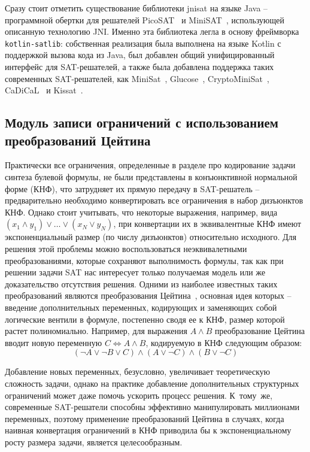 Сразу стоит отметить существование библиотеки jnisat на языке Java \--- программной обертки для решателей PicoSAT~\cite{biere2008} и MiniSAT~\cite{minisat}, использующей описанную технологию JNI.
Именно эта библиотека легла в основу фреймворка \texttt{kotlin-satlib}: собственная реализация была выполнена на языке Kotlin с поддержкой вызова кода из Java, был добавлен общий унифицированный интерфейс для SAT-решателей, а также была добавлена поддержка таких современных SAT-решателей, как MiniSat~\cite{minisat}, Glucose~\cite{glucose}, CryptoMiniSat~\cite{cryptominisat}, CaDiCaL~\cite{cadical} и Kissat~\cite{kissat}.

\subsection{Модуль записи ограничений с использованием преобразований Цейтина}

Практически все ограничения, определенные в разделе про кодирование задачи синтеза булевой формулы, не были представлены в конъюнктивной нормальной форме (КНФ), что затрудняет их прямую передачу в SAT-решатель \--- предварительно необходимо конвертировать все ограничения в набор дизъюнктов КНФ.
Однако стоит учитывать, что некоторые выражения, например, вида ${(x_{1} \land y_{1})} \lor \ldots \lor {(x_{N} \lor y_{N})}$, при конвертации их в эквивалентные КНФ имеют экспоненциальный размер (по числу дизъюнктов) относительно исходного.
Для решения этой проблемы можно воспользоваться неэквивалетными преобразованиями, которые сохраняют выполнимость формулы, так как при решении задачи SAT нас интересует только получаемая модель или же доказательство отсутствия решения.
Одними из наиболее известных таких преобразований являются преобразования Цейтина~\cite{tseitin1970}, основная идея которых \--- введение дополнительных переменных, кодирующих и заменяющих собой логические вентили в формуле, постепенно сводя ее к КНФ, размер которой растет полиномиально.
Например, для выражения $A \land B$ преобразование Цейтина вводит новую переменную $C \iff {A \land B}$, кодируемую в КНФ следующим образом:
\[
    (\neg A \lor \neg B \lor C)
    \land
    (A \lor \neg C)
    \land
    (B \lor \neg C)
\]

Добавление новых переменных, безусловно, увеличивает теоретическую сложность задачи, однако на практике добавление дополнительных структурных ограничений может даже помочь ускорить процесс решения.
К~тому~же, современные SAT-решатели способны эффективно манипулировать миллионами переменных, поэтому применение преобразований Цейтина в случаях, когда наивная конвертация ограничений в КНФ приводила бы к экспоненциальному росту размера задачи, является целесообразным.

